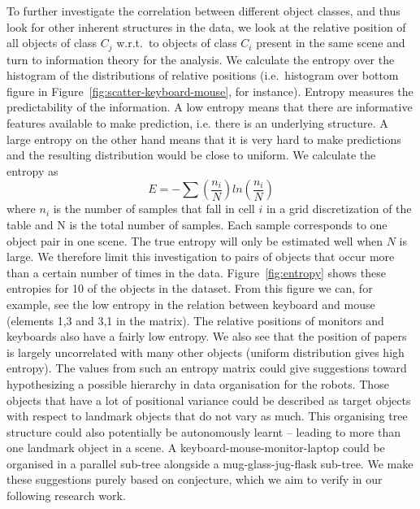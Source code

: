 \documentclass[letterpaper, 10 pt, conference]{ieeeconf}  %
\begin{document}
To further investigate the correlation between different object classes, and 
thus look for other inherent structures in the data, we look at 
the relative position of all objects of class $C_j$ w.r.t.\ to objects of 
class $C_i$ present in the same scene and turn to information theory for the 
analysis. We calculate the entropy over the histogram of the distributions 
of relative positions (i.e.\ histogram over bottom figure in 
Figure~\ref{fig:scatter-keyboard-mouse}, for instance). Entropy measures the 
predictability of the information. A low entropy means that there are 
informative features available to make prediction, i.e. there is an 
underlying structure. A large entropy on the other hand means that it is 
very hard to make predictions and the resulting distribution would be close 
to uniform.
We calculate the entropy as 
\begin{equation}
E=-\sum (\frac{n_i}{N})ln(\frac{n_i}{N})
\end{equation}
where $n_i$ is the number of samples that fall in cell $i$ in a grid 
discretization of the table and N is the total number of samples. Each 
sample corresponds to one object pair in one scene. The true entropy will 
only be estimated well when $N$ is large. We therefore limit this 
investigation to pairs of objects that occur more than a certain number of 
times in the data. Figure~\ref{fig:entropy} shows these entropies 
for 10 of the objects in the dataset. From this figure we can, for example, 
see the low entropy in the relation between keyboard and mouse (elements 1,3 
and 3,1 in the matrix). The relative positions of monitors and keyboards 
also have a fairly low entropy. We also see that the 
position of papers is largely uncorrelated with many other objects (uniform 
distribution gives high entropy). The values from such an entropy matrix 
could give suggestions toward hypothesizing a possible hierarchy in data 
organisation for the robots. Those objects that have a lot of positional 
variance could be described as target objects with respect to landmark 
objects that do not vary as much. This organising tree structure could also 
potentially be autonomously learnt -- leading to more than one landmark object in a scene. A keyboard-mouse-monitor-laptop could be organised in a parallel sub-tree alongside a mug-glass-jug-flask sub-tree. We make these suggestions purely based on conjecture, which we aim to verify in our following research work.
\end{document}
